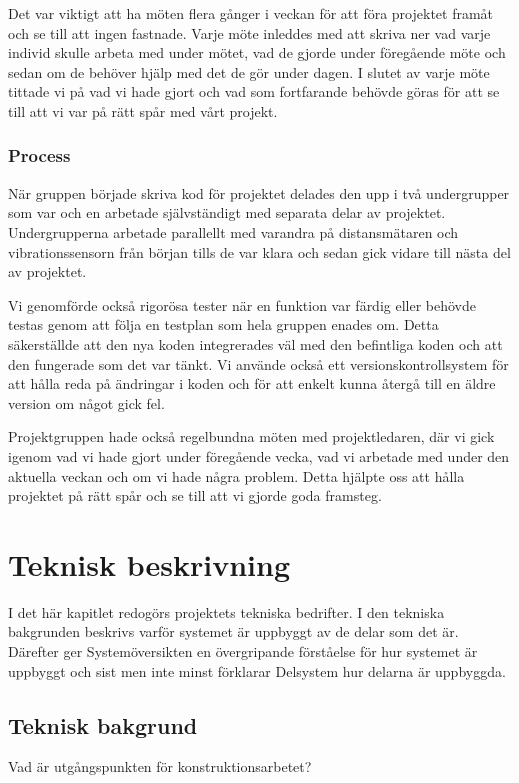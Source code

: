 \documentclass{article}
\begin{document}
Det var viktigt att ha möten flera gånger i veckan för att föra projektet framåt och se till att ingen fastnade. Varje möte inleddes med att skriva ner vad varje individ skulle arbeta med under mötet, vad de gjorde under föregående möte och sedan om de behöver hjälp med det de gör under dagen.  I slutet av varje möte tittade vi på vad vi hade gjort och vad som fortfarande behövde göras för att se till att vi var på rätt spår med vårt projekt.

\subsubsection{Process}
När gruppen började skriva kod för projektet delades den upp i två undergrupper som var och en arbetade självständigt med separata delar av projektet. Undergrupperna arbetade parallellt med varandra på distansmätaren och vibrationssensorn från början tills de var klara och sedan gick vidare till nästa del av projektet.

Vi genomförde också rigorösa tester när en funktion var färdig eller behövde testas genom att följa en testplan som hela gruppen enades om. Detta säkerställde att den nya koden integrerades väl med den befintliga koden och att den fungerade som det var tänkt. Vi använde också ett versionskontrollsystem för att hålla reda på ändringar i koden och för att enkelt kunna återgå till en äldre version om något gick fel.

Projektgruppen hade också regelbundna möten med projektledaren, där vi gick igenom vad vi hade gjort under föregående vecka, vad vi arbetade med under den aktuella veckan och om vi hade några problem. Detta hjälpte oss att hålla projektet på rätt spår och se till att vi gjorde goda framsteg.


\section{Teknisk beskrivning}
I det här kapitlet redogörs projektets tekniska bedrifter. 
I den tekniska bakgrunden beskrivs varför systemet är uppbyggt av de delar som det är.
Därefter ger Systemöversikten en övergripande förståelse för hur systemet är uppbyggt och sist men inte minst förklarar Delsystem hur delarna är uppbyggda.


\subsection{Teknisk bakgrund}
Vad är utgångspunkten för konstruktionsarbetet?
\end{document}
